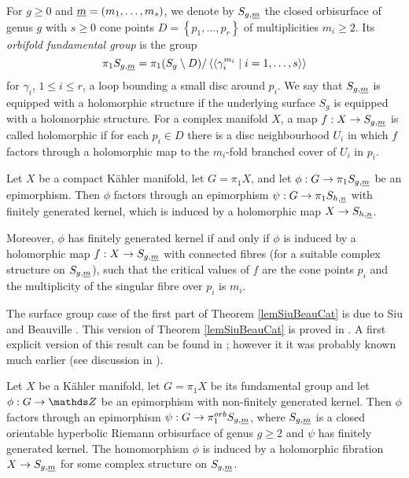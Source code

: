 For $g\geq 0$ and ${\underline{m}}=(m_1,\dots,m_s)$, we denote by $S_{g,{\underline{m}}}$ the closed orbisurface of genus $g$ with $s\geq 0$ cone points $D=\left\{p_1,\dots,p_r\right\}$ of multiplicities $m_i\geq 2$. Its \textit{orbifold fundamental group} is the group
\[
 \pi_1 S_{g,{\underline{m}}} = \pi_1 (S_g \setminus D)/ \left\langle\left\langle \gamma_i ^{m_i} \mid i=1,\dots,s \right\rangle\right\rangle
\]
for $\gamma_i$, $1\leq i \leq r$, a loop bounding a small disc around $p_i$. We say that $S_{g,{\underline{m}}}$ is equipped with a holomorphic structure if the underlying surface $S_g$ is equipped with a holomorphic structure. For a complex manifold $X$, a map $f: X\rightarrow S_{g,{\underline{m}}}$ is called holomorphic if for each $p_i\in D$ there is a disc neighbourhood $U_i$ in which $f$ factors through a holomorphic map to the $m_i$-fold branched cover of $U_i$ in $p_i$.

\begin{theorem}
 Let $X$ be a compact K\"ahler manifold, let $G=\pi_1 X$, and let $\phi: G \rightarrow \pi_1 S_{g,{\underline{m}}}$ be an epimorphism. Then $\phi$ factors through an epimorphism $\psi: G\rightarrow \pi_1 S_{h,{\underline{n}}}$ with finitely generated kernel, which is induced by a holomorphic map $X \to S_{h,{\underline{n}}}$.
 
 Moreover, $\phi$ has finitely generated kernel if and only if $\phi$ is induced by a holomorphic map $f: X \to S_{g,{\underline{m}}}$ with connected fibres (for a suitable complex structure on $S_{g,{\underline{m}}}$), such that the critical values of $f$ are the cone points $p_i$ and the multiplicity of the singular fibre over $p_i$ is $m_i$.
 \label{lemSiuBeauCat}
\end{theorem}

The surface group case of the first part of Theorem \ref{lemSiuBeauCat} is due to Siu \cite{Siu-87} and Beauville \cite{Bea-91}. This version of Theorem \ref{lemSiuBeauCat} is proved in \cite{Del-16}. A first explicit version of this result can be found in \cite{Cat-03}; however it it was probably known much earlier (see discussion in \cite{Kot-12}).

\begin{theorem}
 Let $X$ be a K\"ahler manifold, let $G=\pi_1 X$ be its fundamental group and let $\phi: G\rightarrow \ZZ$ be an epimorphism with non-finitely generated kernel. Then $\phi$ factors through an epimorphism $\psi: G\rightarrow \pi_1^{orb} S_{g,{\underline{m}}}$, where $S_{g,{\underline{m}}}$ is a closed orientable hyperbolic Riemann orbisurface of genus $g\geq 2$ and $\psi$ has finitely generated kernel. The homomorphism $\phi$ is induced by a holomorphic fibration $X\rightarrow S_{g,{\underline{m}}}$ for some complex structure on $S_{g,{\underline{m}}}$.
\label{thmNapRam}
\end{theorem}

